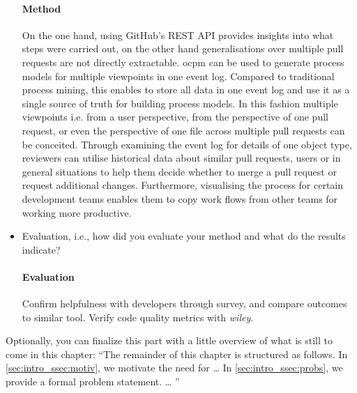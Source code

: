 \begin{itemize}
	\paragraph{Method} On the one hand, using GitHub's REST \ac{API} provides insights into what steps were carried out, on the other hand generalisations over multiple pull requests are not directly extractable. \Ac{ocpm} can be used to generate process models for multiple viewpoints in one event log. Compared to traditional process mining, this enables to store all data in one event log and use it as a single source of truth for building process models. In this fashion multiple viewpoints i.e. from a user perspective, from the perspective of one pull request, or even the perspective of one file across multiple pull requests can be conceited. Through examining the event log for details of one object type, reviewers can utilise historical data about similar pull requests, users or in general situations to help them decide whether to merge a pull request or request additional changes. Furthermore, visualising the process for certain development teams enables them to copy work flows from other teams for working more productive. 
	\item Evaluation, i.e., how did you evaluate your method and what do the results indicate?
	\paragraph{Evaluation} Confirm helpfulness with developers through survey, and compare outcomes to similar tool. Verify code quality metrics with \textit{wiley}.
\end{itemize}

Optionally, you can finalize this part with a little overview of what is still to come in this chapter:
\enquote{The remainder of this chapter is structured as follows.
	In \cref{sec:intro_ssec:motiv}, we motivate the need for \dots{}
	In \cref{sec:intro_ssec:probs}, we provide a formal problem statement.
	\dots
}

